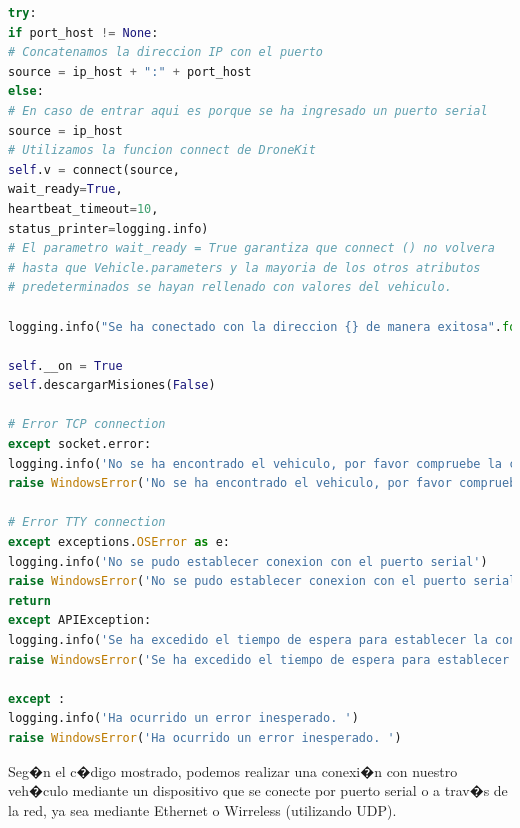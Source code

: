 \begin{lstlisting}[language=python]
try:
if port_host != None:
# Concatenamos la direccion IP con el puerto
source = ip_host + ":" + port_host
else: 
# En caso de entrar aqui es porque se ha ingresado un puerto serial
source = ip_host
# Utilizamos la funcion connect de DroneKit
self.v = connect(source, 
wait_ready=True, 
heartbeat_timeout=10,
status_printer=logging.info)  		
# El parametro wait_ready = True garantiza que connect () no volvera 
# hasta que Vehicle.parameters y la mayoria de los otros atributos
# predeterminados se hayan rellenado con valores del vehiculo.

logging.info("Se ha conectado con la direccion {} de manera exitosa".format(source))

self.__on = True
self.descargarMisiones(False)

# Error TCP connection
except socket.error:
logging.info('No se ha encontrado el vehiculo, por favor compruebe la conexion')
raise WindowsError('No se ha encontrado el vehiculo, por favor compruebe la conexion')

# Error TTY connection
except exceptions.OSError as e:
logging.info('No se pudo establecer conexion con el puerto serial')
raise WindowsError('No se pudo establecer conexion con el puerto serial')
return
except APIException:
logging.info('Se ha excedido el tiempo de espera para establecer la conexion!')
raise WindowsError('Se ha excedido el tiempo de espera para establecer la conexion!')

except :
logging.info('Ha ocurrido un error inesperado. ')
raise WindowsError('Ha ocurrido un error inesperado. ') 

\end{lstlisting}

Seg�n el c�digo mostrado, podemos realizar una conexi�n con nuestro veh�culo mediante un dispositivo que se conecte por puerto serial o a trav�s de la red, ya sea mediante Ethernet o Wirreless (utilizando UDP). 

